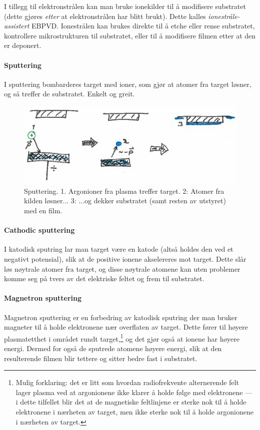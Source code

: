 I tillegg til elektronstrålen kan man bruke ionekilder til å modifisere substratet (dette gjøres \emph{etter} at elektronstrålen har blitt brukt). Dette kalles \emph{ionestråle-assistert} EBPVD. Ionestrålen kan brukes direkte til å etche eller rense substratet, kontrollere mikrostrukturen til substratet, eller til å modifisere filmen etter at den er deponert.

\paragraph{Sputtering} I sputtering bombarderes target med ioner, som gjør at atomer fra target løsner, og så treffer de substratet. Enkelt og greit.
\begin{figure}[H]
\bmd\centering
\includegraphics[width=\linewidth]{metodefigs/sputring.png}
\caption{Sputtering. 1. Argonioner fra plasma treffer target. 2: Atomer fra kilden løsner... 3: ...og dekker substratet (samt resten av utstyret) med en film.}
\emd\end{figure}

\paragraph{Cathodic sputtering} I katodisk sputring lar man target være en katode (altså holdes den ved et negativt potensial), slik at de positive ionene akselereres mot target. Dette slår løs nøytrale atomer fra target, og disse nøytrale atomene kan uten problemer komme seg på tvers av det elektriske feltet og frem til substratet.

\paragraph{Magnetron sputtering} Magnetron sputtering er en forbedring av katodisk sputring der man bruker magneter til å holde elektronene nær overflaten av target. Dette fører til høyere plasmatetthet i området rundt target,\footnote{Mulig forklaring: det er litt som hvordan radiofrekvente alternerende felt lager plasma ved at argonionene ikke klarer å holde følge med elektronene --- i dette tilfellet blir det at de magnetiske feltlinjene er sterke nok til å holde elektronene i nærheten av target, men ikke sterke nok til å holde argonionene i nærheten av target.} og det gjør også at ionene har høyere energi. Dermed for også de sputrede atomene høyere energi, slik at den resulterende filmen blir tettere og sitter bedre fast i substratet.

